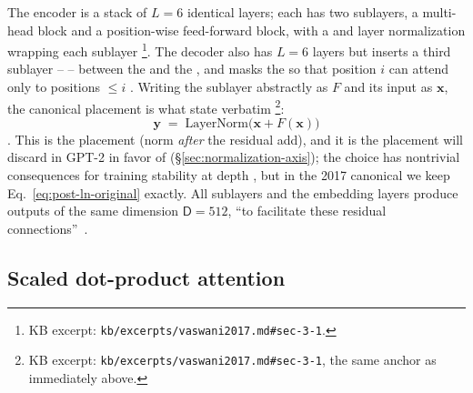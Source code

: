 The encoder is a stack of $L = 6$ identical layers; each has two
sublayers, a multi-head  block and a position-wise
feed-forward block, with a  and layer
normalization wrapping each sublayer%
\footnote{KB excerpt: \nolinkurl{kb/excerpts/vaswani2017.md#sec-3-1}.}.
The decoder also has $L = 6$ layers but inserts a third sublayer --
  -- between the  and
the , and masks the  so that position $i$ can attend
only to positions $\leq i$ \citep[\S 3.1]{vaswani2017}. Writing the
sublayer abstractly as $F$ and its input as $\mathbf{x}$, the
canonical placement is what \citet{vaswani2017} state verbatim%
\footnote{KB excerpt: \nolinkurl{kb/excerpts/vaswani2017.md#sec-3-1}, the same anchor as immediately above.}:
\begin{equation}
  \mathbf{y} \;=\; \mathrm{LayerNorm}\bigl(\mathbf{x} + F(\mathbf{x})\bigr)
  \tag{Vaswani--\S 3.1}
  \label{eq:post-ln-original}
\end{equation}
\citep[\S 3.1]{vaswani2017}. This is the \emph{} placement
(norm \emph{after} the residual add), and it is the placement
\citet{radford2019-gpt2} will discard in GPT-2 in favor of 
(\S\ref{sec:normalization-axis}); the choice has nontrivial
consequences for training stability at depth \citep{xiong2020}, but
in the 2017 canonical we keep Eq.~\eqref{eq:post-ln-original}
exactly. All sublayers and the embedding layers produce outputs of
the same dimension $\mathsf{D} = 512$, ``to facilitate these residual
connections''~\citep[\S 3.1]{vaswani2017}.

\subsection{Scaled dot-product attention}
\label{sec:canonical-attention}

